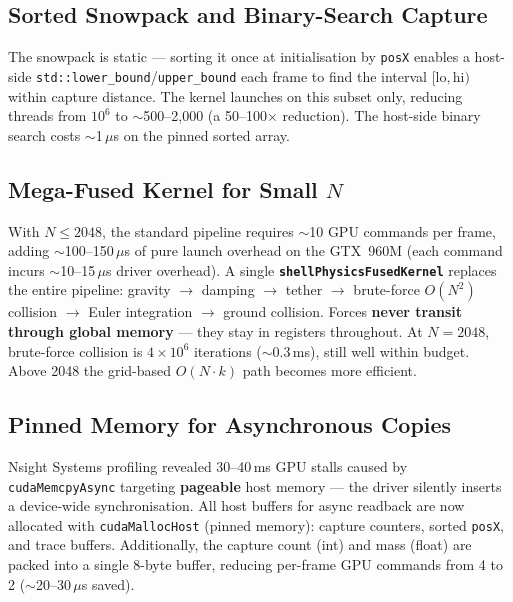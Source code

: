 \subsection{Sorted Snowpack and Binary-Search Capture}
\label{sec:binary_search}

The snowpack is static --- sorting it once at initialisation by \texttt{posX}
enables a host-side \texttt{std::lower\_bound}/\texttt{upper\_bound} each frame
to find the interval $[\text{lo}, \text{hi})$ within capture distance. The
kernel launches on this subset only, reducing threads from $10^6$ to
$\sim$500--2{,}000 (a 50--100$\times$ reduction). The host-side binary search
costs $\sim$1\,$\mu$s on the pinned sorted array.

\subsection{Mega-Fused Kernel for Small $N$}
\label{sec:mega_fused}

With $N \leq 2048$, the standard pipeline requires $\sim$10 GPU commands per
frame, adding $\sim$100--150\,$\mu$s of pure launch overhead on the GTX~960M
(each command incurs $\sim$10--15\,$\mu$s driver overhead). A single
\textbf{\texttt{shellPhysicsFusedKernel}} replaces the entire pipeline: gravity
$\to$ damping $\to$ tether $\to$ brute-force $O(N^2)$ collision $\to$ Euler
integration $\to$ ground collision. Forces \textbf{never transit through global
memory} --- they stay in registers throughout. At $N = 2048$, brute-force
collision is $4 \times 10^6$ iterations ($\sim$0.3\,ms), still well within
budget. Above 2048 the grid-based $O(N \cdot k)$ path becomes more efficient.

\subsection{Pinned Memory for Asynchronous Copies}
\label{sec:pinned}

Nsight Systems profiling revealed 30--40\,ms GPU stalls caused by
\texttt{cudaMemcpyAsync} targeting \textbf{pageable} host memory --- the driver
silently inserts a device-wide synchronisation. All host buffers for async
readback are now allocated with \texttt{cudaMallocHost} (pinned memory):
capture counters, sorted \texttt{posX}, and trace buffers. Additionally,
the capture count (int) and mass (float) are packed into a single 8-byte
buffer, reducing per-frame GPU commands from 4 to 2 ($\sim$20--30\,$\mu$s
saved).

